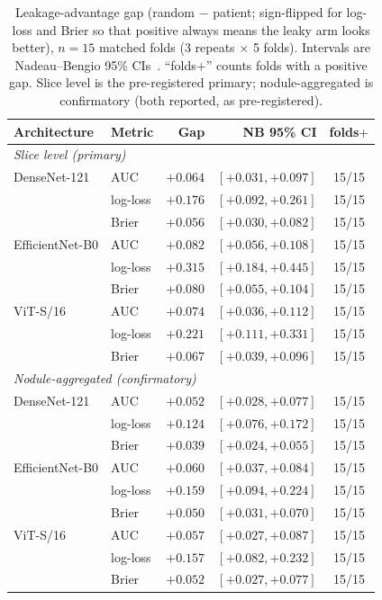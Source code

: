 \documentclass{ieeeaccess}
\newcommand{\vcite}[1]{\cite{#1}}
\begin{document}
\begin{table}[t]
\centering
\caption{Leakage-advantage gap (random $-$ patient; sign-flipped for log-loss and Brier so that
positive always means the leaky arm looks better), $n=15$ matched folds (3 repeats $\times$ 5 folds).
Intervals are Nadeau--Bengio 95\% CIs~\vcite{nadeau2003}. ``folds$+$'' counts folds with a positive
gap. Slice level is the pre-registered primary; nodule-aggregated is confirmatory (both reported, as
pre-registered).}
\label{tab:gap}
\small
\begin{tabular}{llrrc}
\hline
Architecture & Metric & Gap & NB 95\% CI & folds$+$ \\
\hline
\multicolumn{5}{l}{\emph{Slice level (primary)}}\\
DenseNet-121     & AUC      & $+0.064$ & $[+0.031, +0.097]$ & 15/15 \\
                 & log-loss & $+0.176$ & $[+0.092, +0.261]$ & 15/15 \\
                 & Brier    & $+0.056$ & $[+0.030, +0.082]$ & 15/15 \\
EfficientNet-B0  & AUC      & $+0.082$ & $[+0.056, +0.108]$ & 15/15 \\
                 & log-loss & $+0.315$ & $[+0.184, +0.445]$ & 15/15 \\
                 & Brier    & $+0.080$ & $[+0.055, +0.104]$ & 15/15 \\
ViT-S/16         & AUC      & $+0.074$ & $[+0.036, +0.112]$ & 15/15 \\
                 & log-loss & $+0.221$ & $[+0.111, +0.331]$ & 15/15 \\
                 & Brier    & $+0.067$ & $[+0.039, +0.096]$ & 15/15 \\
\hline
\multicolumn{5}{l}{\emph{Nodule-aggregated (confirmatory)}}\\
DenseNet-121     & AUC      & $+0.052$ & $[+0.028, +0.077]$ & 15/15 \\
                 & log-loss & $+0.124$ & $[+0.076, +0.172]$ & 15/15 \\
                 & Brier    & $+0.039$ & $[+0.024, +0.055]$ & 15/15 \\
EfficientNet-B0  & AUC      & $+0.060$ & $[+0.037, +0.084]$ & 15/15 \\
                 & log-loss & $+0.159$ & $[+0.094, +0.224]$ & 15/15 \\
                 & Brier    & $+0.050$ & $[+0.031, +0.070]$ & 15/15 \\
ViT-S/16         & AUC      & $+0.057$ & $[+0.027, +0.087]$ & 15/15 \\
                 & log-loss & $+0.157$ & $[+0.082, +0.232]$ & 15/15 \\
                 & Brier    & $+0.052$ & $[+0.027, +0.077]$ & 15/15 \\
\hline
\end{tabular}
\end{table}
\end{document}
